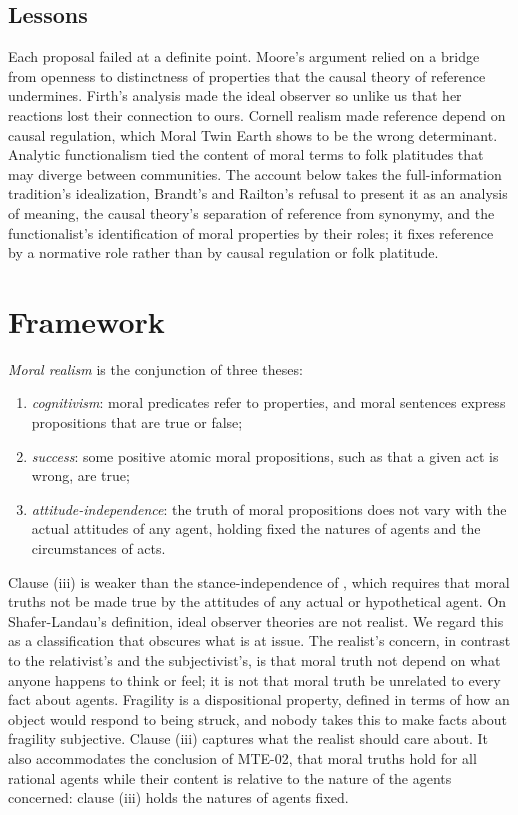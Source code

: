 \documentclass{situationist-preprint}
\begin{document}
\subsection{Lessons}

Each proposal failed at a definite point. Moore's argument relied on a bridge from openness to distinctness of properties that the causal theory of reference undermines. Firth's analysis made the ideal observer so unlike us that her reactions lost their connection to ours. Cornell realism made reference depend on causal regulation, which Moral Twin Earth shows to be the wrong determinant. Analytic functionalism tied the content of moral terms to folk platitudes that may diverge between communities. The account below takes the full-information tradition's idealization, Brandt's and Railton's refusal to present it as an analysis of meaning, the causal theory's separation of reference from synonymy, and the functionalist's identification of moral properties by their roles; it fixes reference by a normative role rather than by causal regulation or folk platitude.

\section{Framework}\label{s:frame}

\begin{definition}\label{d:realism}
\emph{Moral realism} is the conjunction of three theses:
\begin{enumerate}[label=(\roman*)]
\item \emph{cognitivism}: moral predicates refer to properties, and moral sentences express propositions that are true or false;
\item \emph{success}: some positive atomic moral propositions, such as that a given act is wrong, are true;
\item \emph{attitude-independence}: the truth of moral propositions does not vary with the actual attitudes of any agent, holding fixed the natures of agents and the circumstances of acts.
\end{enumerate}
\end{definition}

Clause (iii) is weaker than the stance-independence of \citet{ShaferLandau2003}, which requires that moral truths not be made true by the attitudes of any actual or hypothetical agent. On Shafer-Landau's definition, ideal observer theories are not realist. We regard this as a classification that obscures what is at issue. The realist's concern, in contrast to the relativist's and the subjectivist's, is that moral truth not depend on what anyone happens to think or feel; it is not that moral truth be unrelated to every fact about agents. Fragility is a dispositional property, defined in terms of how an object would respond to being struck, and nobody takes this to make facts about fragility subjective. Clause (iii) captures what the realist should care about. It also accommodates the conclusion of MTE-02, that moral truths hold for all rational agents while their content is relative to the nature of the agents concerned: clause (iii) holds the natures of agents fixed.
\end{document}
